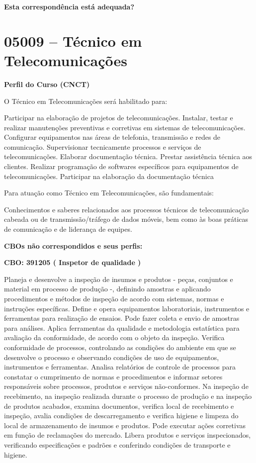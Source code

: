 \documentclass[
]{article}
\begin{document}
\begin{Form}
\textbf{Esta correspondência está adequada?} \\ 
\end{Form}

\newpage
\section{ 05009 -- Técnico em Telecomunicações }

\textbf{Perfil do Curso (CNCT)}

O Técnico em Telecomunicações será habilitado para:

Participar na elaboração de projetos de telecomunicações. Instalar,
testar e realizar manutenções preventivas e corretivas em sistemas de
telecomunicações. Configurar equipamentos nas áreas de telefonia,
transmissão e redes de comunicação. Supervisionar tecnicamente processos
e serviços de telecomunicações. Elaborar documentação técnica. Prestar
assistência técnica aos clientes. Realizar programação de softwares
específicos para equipamentos de telecomunicações. Participar na
elaboração da documentação técnica

Para atuação como Técnico em Telecomunicações, são fundamentais:

Conhecimentos e saberes relacionados aos processos técnicos de
telecomunicação cabeada ou de transmissão/tráfego de dados móveis, bem
como às boas práticas de comunicação e de liderança de equipes.

\textbf{CBOs não correspondidos e seus perfis:}

\textbf{CBO: 391205  ( Inspetor de qualidade )}

Planeja e desenvolve a inspeção de insumos e produtos - peças, conjuntos
e material em processo de produção -, definindo amostras e aplicando
procedimentos e métodos de inspeção de acordo com sistemas, normas e
instruções específicas. Define e opera equipamentos laboratoriais,
instrumentos e ferramentas para realização de ensaios. Pode fazer coleta
e envio de amostras para análises. Aplica ferramentas da qualidade e
metodologia estatística para avaliação da conformidade, de acordo com o
objeto da inspeção. Verifica conformidade de processos, controlando as
condições do ambiente em que se desenvolve o processo e observando
condições de uso de equipamentos, instrumentos e ferramentas. Analisa
relatórios de controle de processos para constatar o cumprimento de
normas e procedimentos e informar setores responsáveis sobre processos,
produtos e serviços não-conformes. Na inspeção de recebimento, na
inspeção realizada durante o processo de produção e na inspeção de
produtos acabados, examina documentos, verifica local de recebimento e
inspeção, avalia condições de descarregamento e verifica higiene e
limpeza do local de armazenamento de insumos e produtos. Pode executar
ações corretivas em função de reclamações do mercado. Libera produtos e
serviços inspecionados, verificando especificações e padrões e
conferindo condições de transporte e higiene.
\end{document}
